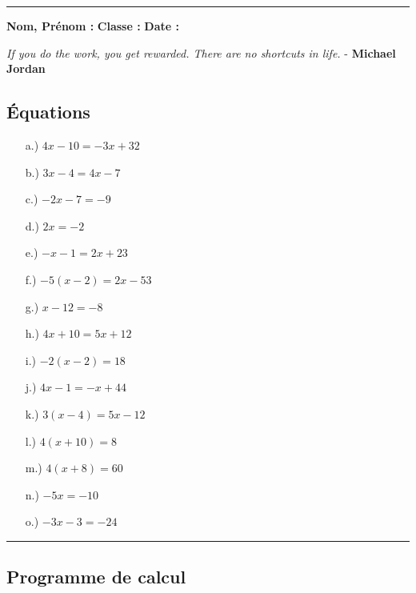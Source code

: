 \documentclass[11pt]{article}
\newcommand{\horrule}[1]{\rule{\linewidth}{#1}} %
\begin{document}
\vspace{1cm}
\horrule{1px}
\vspace{1cm}

\textbf{Nom, Prénom :} \hspace{8cm} \textbf{Classe :} \hspace{3cm} \textbf{Date :}\\
\vspace{-0.8cm}
\begin{center}
  \textit{If you do the work, you get rewarded. There are no shortcuts in life.}  - \textbf{Michael Jordan}
\end{center}
\vspace{-0.8cm}

\subsection*{Équations}
\begin{multicols}{3}\noindent
  \begin{enumerate}
  \item[a.)] $	4x - 10 = -3x + 32$
  \item[b.)] $3x - 4 = 4x - 7$
  \item[c.)] $-2x - 7 = -9$
  \item[d.)] $2x = -2$
  \item[e.)] $	-x - 1 = 2x + 23$
  \item[f.)] $-5(x - 2) = 2x - 53$
  \item[g.)] $	x - 12 = -8$
  \item[h.)] $4x + 10 = 5x + 12$
  \item[i.)] $-2(x - 2) = 18$
  \item[j.)] $4x - 1 = -x + 44$
  \item[k.)] $	3(x - 4) = 5x - 12$
  \item[l.)] $	4(x + 10) = 8$
  \item[m.)] $4(x + 8) = 60$
  \item[n.)] $-5x = -10$
  \item[o.)] $-3x - 3 = -24$
  \end{enumerate}
\end{multicols}

\vspace{-0.4cm}
\horrule{1px}
\vspace{-0.8cm}

\subsection*{Programme de calcul}
\end{document}
